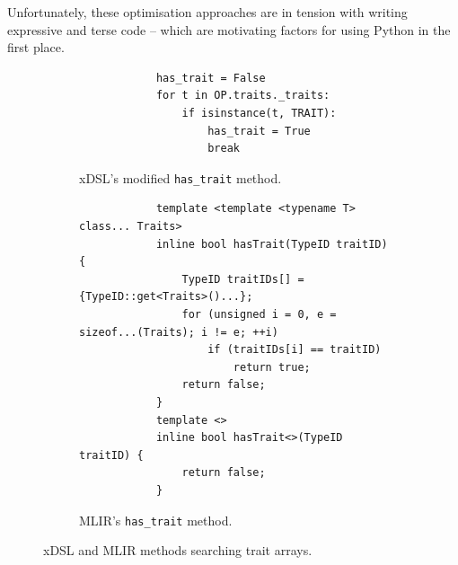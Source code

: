 Unfortunately, these optimisation approaches are in tension with writing expressive and terse code -- which are motivating factors for using Python in the first place.

\begin{figure}[H]
    \centering
    \begin{subfigure}[b]{0.45\textwidth}
       \centering
        \begin{verbatim}
            has_trait = False
            for t in OP.traits._traits:
                if isinstance(t, TRAIT):
                    has_trait = True
                    break
        \end{verbatim}
        \footnotesize\vspace{5.5em}
        \captionsetup{name=Listing}
        \caption{xDSL's modified \texttt{has_trait} method.}
        \label{listing:ubenchmark-trait-checks-both-xdsl}
    \end{subfigure}
    \hfill
    \begin{subfigure}[b]{0.45\textwidth}
        \centering
        \begin{verbatim}
            template <template <typename T> class... Traits>
            inline bool hasTrait(TypeID traitID) {
                TypeID traitIDs[] = {TypeID::get<Traits>()...};
                for (unsigned i = 0, e = sizeof...(Traits); i != e; ++i)
                    if (traitIDs[i] == traitID)
                        return true;
                return false;
            }
            template <>
            inline bool hasTrait<>(TypeID traitID) {
                return false;
            }
        \end{verbatim}
        \captionsetup{name=Listing}
        \caption{MLIR's \texttt{has_trait} method.}
        \label{listing:ubenchmark-trait-checks-both-mlir}
    \end{subfigure}
    \vspace{1em}
    \captionsetup{name=Listing}
    \caption{xDSL and MLIR methods searching trait arrays.}
    \label{listing:ubenchmark-trait-checks-both}
\end{figure}

